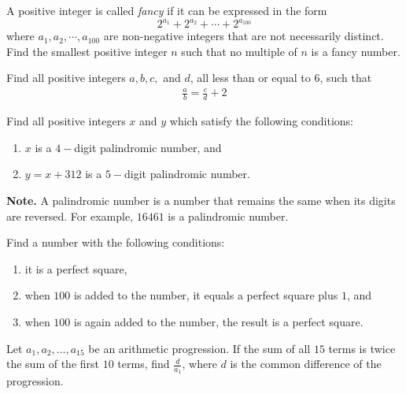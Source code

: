 \begin{problem}[APMO 2016]
	A positive integer is called \textit{fancy} if it can be expressed in the form $$2^{a_1}+2^{a_2}+ \cdots+ 2^{a_{100}}$$where $a_1,a_2, \cdots, a_{100}$ are non-negative integers that are not necessarily distinct. Find the smallest positive integer $n$ such that no multiple of $n$ is a fancy number. %
\end{problem}

\begin{problem}
	Find all positive integers $a,b,c,$ and $d$, all less than or equal to $6$, such that
	\begin{align*}
		\frac{a}{b} = \frac{c}{d} + 2
	\end{align*}
\end{problem}

\begin{problem}
	Find all positive integers $x$ and $y$ which satisfy the following conditions:
	\begin{enumerate}
		\item $x$ is a $4-$digit palindromic number, and
		\item $y=x+312$ is a $5-$digit palindromic number.
	\end{enumerate}
	\textbf{Note.} A palindromic number is a number that remains the same when its digits are reversed. For example, $16461$ is a palindromic number.
\end{problem}

\begin{problem}
	Find a number with the following conditions:
	\begin{enumerate}
		\item it is a perfect square,
		\item when $100$ is added to the number, it equals a perfect square plus $1$, and
		\item when $100$ is again added to the number, the result is a perfect square.
	\end{enumerate}
\end{problem}

\begin{problem}
	Let $a_1, a_2, \dots, a_{15}$ be an arithmetic progression. If the sum of all $15$ terms is twice the sum of the first $10$ terms, find $\frac{d}{a_1}$, where $d$ is the common difference of the progression.
\end{problem}

